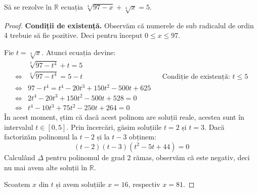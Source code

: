 \begin{exercise}[4.24]
Să se rezolve în \(\mathbb{R}\) ecuația \(\sqrt[4]{97 - x} + \sqrt[4]{x} = 5\).
\end{exercise}
\begin{proof}
\textbf{Condiții de existență.}
Observăm că numerele de sub radicalul de ordin 4 trebuie să fie pozitive.
Deci pentru început \(0 \leq x \leq 97\).

Fie \(t = \sqrt[4]{x}\). Atunci ecuația devine:
\begin{align*}
    &\sqrt[4]{97 - t^4} + t = 5 \\
    \iff &\sqrt[4]{97 - t^4} = 5 - t && \text{Condiție de existență: \(t \leq 5\)} \\
    \iff &97 - t^4 = t^4 - 20 t^3 + 150 t^2 - 500 t + 625 \\
    \iff &2 t^4 - 20 t^3 + 150 t^2 - 500t + 528 = 0 \\
    \iff &t^4 - 10 t^3 + 75 t^2 - 250t + 264 = 0
\end{align*}
În acest moment, știm că dacă acest polinom are soluții reale, acestea sunt în intervalul \(t \in [0, 5]\).
Prin încercări, găsim soluțiile \(t = 2\) și \(t = 3\). Dacă factorizăm polinomul la \(t - 2\) și la \(t - 3\) obținem:
\[
(t - 2)(t - 3)(t^2 - 5t + 44) = 0
\]
Calculând \(\Delta\) pentru polinomul de grad 2 rămas, observăm că este negativ, deci nu mai avem alte soluții în \(\mathbb{R}\).

Scoatem \(x\) din \(t\) și avem soluțiile \(x = 16\), respectiv \(x = 81\).
\end{proof}

